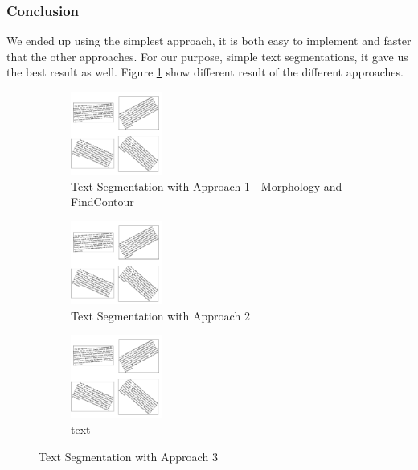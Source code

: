 \documentclass[11pt,a4paper,UKenglish]{article}
\begin{document}
\subsubsection{Conclusion}
We ended up using the simplest approach, it is both easy to implement and faster that the other approaches. For our purpose, simple text segmentations, it gave us the best result as well. Figure \ref{fig:Text_detection_approaches} show different result of the different approaches.

\begin{figure}
  \centering
  \begin{subfigure}[t]{4cm}
    \includegraphics[width=3cm]{res/segment_text1.png}
    \caption{Text Segmentation with Approach 1 - Morphology and FindContour}
  \end{subfigure}
  \hspace{5mm}%
  \begin{subfigure}[t]{4cm}
    \includegraphics[width=3cm]{res/segment_text1.png}
    \caption{Text Segmentation with Approach 2}
  \end{subfigure}
  \hspace{5mm}%
  \begin{subfigure}[t]{4cm}
    \includegraphics[width=3cm]{res/segment_text1.png}
    \caption{text}
  \end{subfigure}
  \caption{Text Segmentation with Approach 3}
  \label{fig:Text_detection_approaches}
\end{figure}




\end{document}
